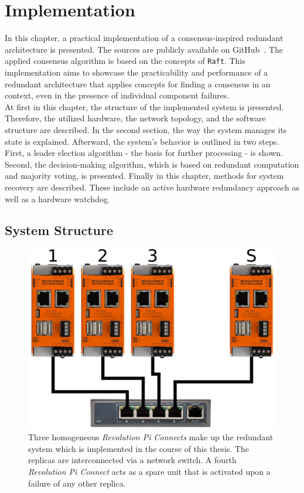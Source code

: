 \chapter{Implementation}
\label{cpt:Implementation}

In this chapter, a practical implementation of a consensus-inspired redundant architecture is presented.
The sources are publicly available on GitHub~\cite{GitHubSources}.
The applied consensus algorithm is based on the concepts of \texttt{Raft}.
This implementation aims to showcase the practicability and performance of a redundant architecture that applies  concepts for finding a consensus in an  context, even in the presence of individual component failures.
\\

At first in this chapter, the structure of the implemented system is presented.
Therefore, the utilized hardware, the network topology, and the software structure are described.
In the second section, the way the system manages its state is explained.
Afterward, the system's behavior is outlined in two steps.
First, a leader election algorithm - the basis for further processing - is shown.
Second, the decision-making algorithm, which is based on redundant computation and majority voting, is presented.
Finally in this chapter, methods for system recovery are described.
These include an active hardware redundancy approach as well as a hardware watchdog.

\section{System Structure}

\begin{figure}[!ht]
	\centering
	\includegraphics[width=0.8\linewidth]{images/setup}
	\caption{Three homogeneous \textit{Revolution Pi Connects} make up the redundant system which is implemented in the course of this thesis. The replicas are interconnected via a network switch. A fourth \textit{Revolution Pi Connect} acts as a spare unit that is activated upon a failure of any other replica.}
	\label{fig:SystemSetup}
\end{figure}

